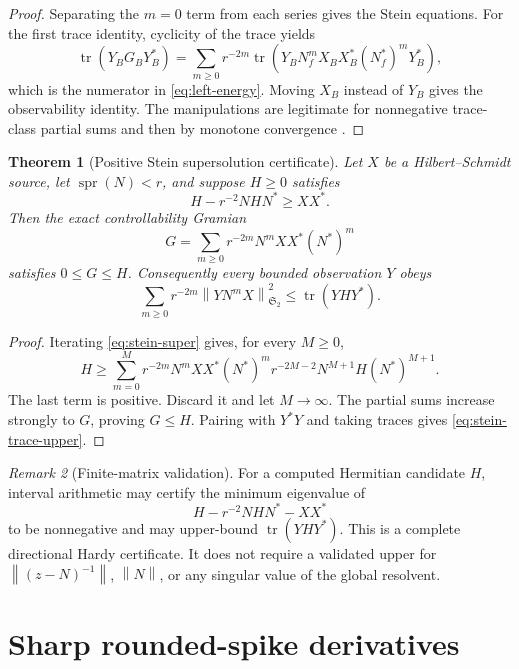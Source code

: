\documentclass[11pt]{article}
\newtheorem{theorem}{Theorem}[section]
\theoremstyle{definition}
\theoremstyle{remark}
\newtheorem{remark}[theorem]{Remark}
\newcommand{\HS}{\mathfrak S_2}
\newcommand{\tr}{\operatorname{tr}}
\newcommand{\spr}{\operatorname{spr}}
\newcommand{\norm}[1]{\left\lVert #1\right\rVert}
\begin{document}
\begin{proof}
Separating the \(m=0\) term from each series gives the Stein equations.
For the first trace identity, cyclicity of the trace yields
\[
 \tr(Y_BG_BY_B^*)
 =
 \sum_{m\ge0}r^{-2m}
 \tr\!\left(
  Y_BN_f^mX_BX_B^*(N_f^*)^mY_B^*
 \right),
\]
which is the numerator in \eqref{eq:left-energy}.  Moving \(X_B\) instead
of \(Y_B\) gives the observability identity.  The manipulations are
legitimate for nonnegative trace-class partial sums and then by monotone
convergence \citep{Simon2005}.
\end{proof}

\begin{theorem}[Positive Stein supersolution certificate]
\label{thm:stein-certificate}
Let \(X\) be a Hilbert--Schmidt source, let \(\spr(N)<r\), and suppose
\(H\ge0\) satisfies
\begin{equation}
 H-r^{-2}NHN^*\ge XX^*.
 \label{eq:stein-super}
\end{equation}
Then the exact controllability Gramian
\[
 G=\sum_{m\ge0}r^{-2m}N^mXX^*(N^*)^m
\]
satisfies \(0\le G\le H\).  Consequently every bounded observation \(Y\)
obeys
\begin{equation}
 \sum_{m\ge0}r^{-2m}\norm{YN^mX}_{\HS}^2
 \le\tr(YHY^*).
 \label{eq:stein-trace-upper}
\end{equation}
\end{theorem}

\begin{proof}
Iterating \eqref{eq:stein-super} gives, for every \(M\ge0\),
\[
 H\ge
 \sum_{m=0}^{M}r^{-2m}N^mXX^*(N^*)^m
 r^{-2M-2}N^{M+1}H(N^*)^{M+1}.
\]
The last term is positive.  Discard it and let \(M\to\infty\).  The partial
sums increase strongly to \(G\), proving \(G\le H\).  Pairing with
\(Y^*Y\) and taking traces gives \eqref{eq:stein-trace-upper}.
\end{proof}

\begin{remark}[Finite-matrix validation]
For a computed Hermitian candidate \(H\), interval arithmetic may certify
the minimum eigenvalue of
\[
 H-r^{-2}NHN^*-XX^*
\]
to be nonnegative and may upper-bound \(\tr(YHY^*)\).  This is a complete
directional Hardy certificate.  It does not require a validated upper for
\(\norm{(z-N)^{-1}}\), \(\norm N\), or any singular value of the global
resolvent.
\end{remark}

\section{Sharp rounded-spike derivatives}
\label{sec:derivatives}
\end{document}
